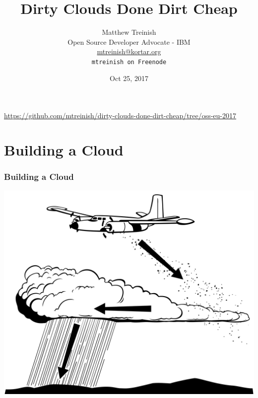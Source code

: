 \documentclass[aspectratio=169,11pt,hyperref={colorlinks=true}]{beamer}
\author[Matthew Treinish]{%
    \texorpdfstring{%
        \centering
        Matthew Treinish\\
        Open Source Developer Advocate - IBM \\
        \href{mailto:mtreinish@kortar.org}{mtreinish@kortar.org}\\
        \texttt{mtreinish on Freenode}
   }
   {Matthew Treinish}
}
\date{Oct 25, 2017}
\title[Dirty Clouds Done Dirt Cheap
\hspace{2em}\insertframenumber/\inserttotalframenumber]{Dirty Clouds Done Dirt Cheap}
\begin{document}
{%
\begin{frame}[noframenumbering]
    \hypersetup{colorlinks,urlcolor=white}
    \titlepage{}
    \centering
    \href{https://github.com/mtreinish/dirty-clouds-done-dirt-cheap/tree/oss-eu-2017}{https://github.com/mtreinish/dirty-clouds-done-dirt-cheap/tree/oss-eu-2017}
\end{frame}
}

\section{Building a Cloud}
\begin{frame}
\frametitle{Building a Cloud}
\centering
\includegraphics[width=.775\textwidth]{cloud_seeding.png}
\end{frame}
\end{document}
